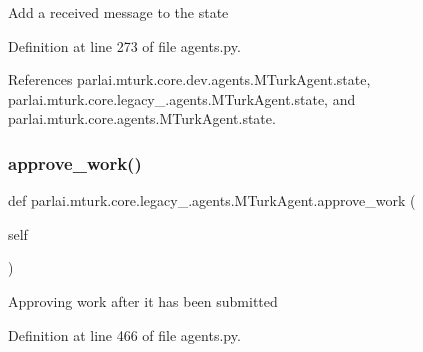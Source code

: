 \begin{DoxyVerb}Add a received message to the state\end{DoxyVerb}
 

Definition at line 273 of file agents.\+py.



References parlai.\+mturk.\+core.\+dev.\+agents.\+M\+Turk\+Agent.\+state, parlai.\+mturk.\+core.\+legacy\+\_.\+agents.\+M\+Turk\+Agent.\+state, and parlai.\+mturk.\+core.\+agents.\+M\+Turk\+Agent.\+state.

\mbox{\label{classparlai_1_1mturk_1_1core_1_1legacy__2018_1_1agents_1_1MTurkAgent_a814894377ea555da46004a6459e30418}} 
\subsubsection{\texorpdfstring{approve\+\_\+work()}{approve\_work()}}
{\footnotesize\ttfamily def parlai.\+mturk.\+core.\+legacy\+\_.\+agents.\+M\+Turk\+Agent.\+approve\+\_\+work (\begin{DoxyParamCaption}\item[{}]{self }\end{DoxyParamCaption})}

\begin{DoxyVerb}Approving work after it has been submitted\end{DoxyVerb}
 

Definition at line 466 of file agents.\+py.




